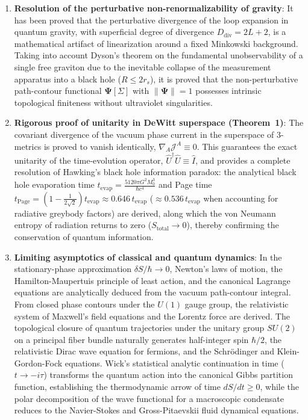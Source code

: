 \begin{enumerate}
\item \textbf{Resolution of the perturbative non-renormalizability of gravity}: It has been proved that the perturbative divergence of the loop expansion in quantum gravity, with superficial degree of divergence $D_{\text{div}} = 2L + 2$, is a mathematical artifact of linearization around a fixed Minkowski background. Taking into account Dyson's theorem on the fundamental unobservability of a single free graviton due to the inevitable collapse of the measurement apparatus into a black hole ($R \le 2 r_s$), it is proved that the non-perturbative path-contour functional $\mathbf{\Psi}[\Sigma]$ with $\|\mathbf{\Psi}\| = 1$ possesses intrinsic topological finiteness without ultraviolet singularities.

\item \textbf{Rigorous proof of unitarity in DeWitt superspace (Theorem~1)}: The covariant divergence of the vacuum phase current in the superspace of 3-metrics is proved to vanish identically, $\nabla_A \mathcal{J}^A \equiv 0$. This guarantees the exact unitarity of the time-evolution operator, $\hat{U}^\dagger \hat{U} \equiv \hat{I}$, and provides a complete resolution of Hawking's black hole information paradox: the analytical black hole evaporation time $t_{\text{evap}} = \frac{5120\pi G^2 M_0^3}{\hbar c^4}$ and Page time $t_{\text{Page}} = \left( 1 - \frac{1}{2\sqrt{2}} \right) t_{\text{evap}} \approx 0.646\,t_{\text{evap}}$ ($\approx 0.536\,t_{\text{evap}}$ when accounting for radiative greybody factors) are derived, along which the von Neumann entropy of radiation returns to zero ($S_{\text{total}} \to 0$), thereby confirming the conservation of quantum information.

\item \textbf{Limiting asymptotics of classical and quantum dynamics}: In the stationary-phase approximation $\delta S / \hbar \to 0$, Newton's laws of motion, the Hamilton-Maupertuis principle of least action, and the canonical Lagrange equations are analytically deduced from the vacuum path-contour integral. From closed phase contours under the $U(1)$ gauge group, the relativistic system of Maxwell's field equations and the Lorentz force are derived. The topological closure of quantum trajectories under the unitary group $SU(2)$ on a principal fiber bundle naturally generates half-integer spin $\hbar/2$, the relativistic Dirac wave equation for fermions, and the Schrödinger and Klein-Gordon-Fock equations. Wick's statistical analytic continuation in time ($t \to -i\tau$) transforms the quantum action into the canonical Gibbs partition function, establishing the thermodynamic arrow of time $dS/dt \ge 0$, while the polar decomposition of the wave functional for a macroscopic condensate reduces to the Navier-Stokes and Gross-Pitaevskii fluid dynamical equations.


\end{enumerate}
